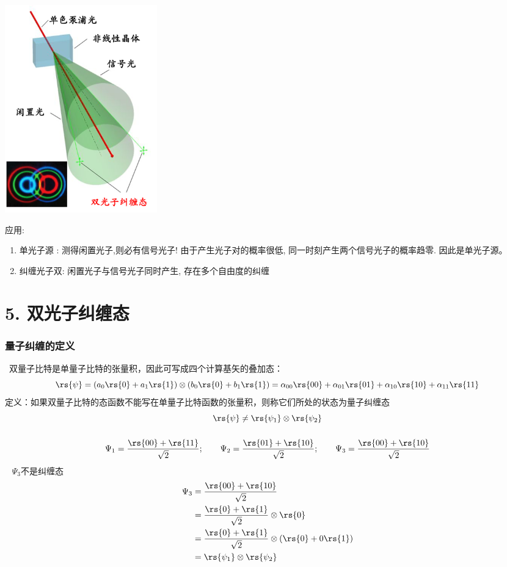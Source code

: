 \begin{frame}
    \frametitle{}
    \begin{center}
        \includegraphics[width=0.29\textwidth]{figs/32.png}
    \end{center} 
    应用:
 \begin{enumerate}
     \item 单光子源 : 测得闲置光子,则必有信号光子! 由于产生光子对的概率很低, 同一时刻产生两个信号光子的概率趋零. 因此是单光子源。
     \item 纠缠光子双: 闲置光子与信号光子同时产生, 存在多个自由度的纠缠
 \end{enumerate} 
\end{frame}

\section{5. 双光子纠缠态}

\begin{frame} 
    \frametitle{量子纠缠的定义}
    {\Bullet} ~双量子比特是单量子比特的张量积，因此可写成四个计算基矢的叠加态：
    \[\rs{\psi} =(a_0\rs{0}+a_1\rs{1})\otimes (b_0\rs{0}+b_1\rs{1})=\alpha_{00}\rs{00}+\alpha_{01}\rs{01}+\alpha_{10}\rs{10}+\alpha_{11}\rs{11}\]
    {\Bullet} 定义：如果双量子比特的态函数不能写在单量子比特函数的张量积，则称它们所处的状态为量子纠缠态
    \[\rs{\psi} \neq \rs{\psi_{1}} \otimes \rs{\psi_{2}} \]
\end{frame} 

\begin{frame} 
    \frametitle{}
    \例 [8. 试确定下列态哪些是纠缠态]{}
    {\[ \Psi_1=\frac{\rs{00}+\rs{11}}{\sqrt{2}}; \qquad \Psi_2=\frac{\rs{01}+\rs{10}}{\sqrt{2}} ; \qquad \Psi_3=\frac{\rs{00}+\rs{10}}{\sqrt{2}} \]}
    \解~ $\Psi_3$不是纠缠态
    \[\begin{aligned}
        \Psi_3 &= \frac{\rs{00}+\rs{10}}{\sqrt{2}} \\
        &= \frac{\rs{0}+\rs{1}}{\sqrt{2}}\otimes \rs{0} \\
        &= \frac{\rs{0}+\rs{1}}{\sqrt{2}}\otimes (\rs{0}+0\rs{1}) \\
        &= \rs{\psi_{1}} \otimes \rs{\psi_{2}} 
    \end{aligned}\] 
\end{frame} 


